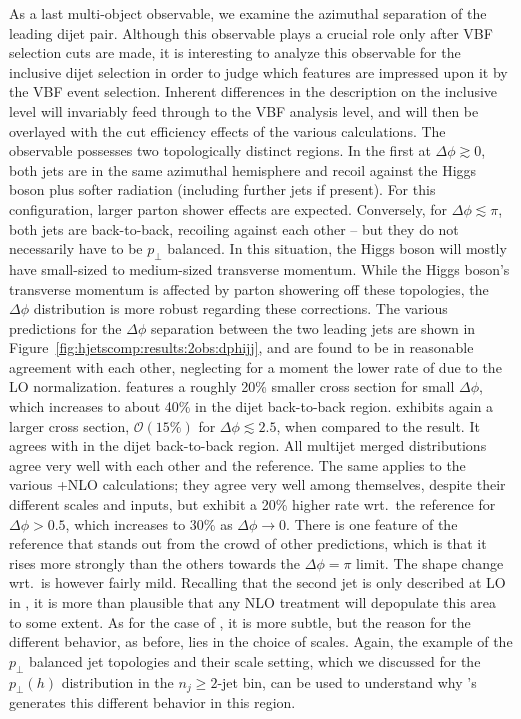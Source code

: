 As a last multi-object observable, we examine the azimuthal separation of 
the leading dijet pair. Although this observable plays a crucial role 
only after VBF selection cuts are made,  it is interesting to analyze this
observable for the inclusive dijet selection in order to judge which features
are impressed upon it by the VBF event selection.
Inherent differences in the description on the inclusive level will
invariably feed through to the VBF analysis level, and will then be
overlayed with the cut efficiency effects of the various calculations.
The observable possesses two topologically distinct regions. In the
first at $\Delta\phi\gtrsim0$, both jets are in the same azimuthal
hemisphere and recoil against the Higgs boson plus softer radiation
(including further jets if present). 
For this configuration, larger
parton shower effects are expected.
Conversely, for $\Delta\phi\lesssim\pi$, both jets are back-to-back,
recoiling against each other -- but they do not necessarily have to be
$p_\perp$ balanced. In this situation, the Higgs boson will
mostly have small-sized to medium-sized transverse momentum.
While the Higgs boson's transverse momentum is affected by parton
showering off these topologies, the $\Delta\phi$ distribution is more
robust regarding these corrections.
The various predictions for the $\Delta\phi$ separation between the
two leading jets are shown in Figure~\ref{fig:hjetscomp:results:2obs:dphijj},
and are found to be in reasonable agreement with each other,
neglecting for a moment the lower rate of \hjetscompHej due to the LO
normalization. \hjetscompHej
features a roughly 20\% smaller cross section for small $\Delta\phi$,
which increases to about 40\% in the dijet back-to-back region.
\hjetscompSherpa \hjetscompNNLOPS exhibits again a larger cross section,
$\mathcal{O}(15\%)$ for $\Delta\phi\lesssim2.5$, when compared to the
\hjetscompPowheg \hjetscompNNLOPS result. It agrees with \hjetscompPowheg \hjetscompNNLOPS  in the dijet back-to-back
region. All multijet merged distributions agree very well with each
other and the reference. The same applies to the various
\hjetscompGoSam{}+\hjetscompSherpa NLO calculations; they agree very well among
themselves, despite their different scales and inputs, but exhibit a
20\% higher rate wrt.~the reference for $\Delta\phi>0.5$, which
increases to 30\% as $\Delta\phi\to0$. 
There is one feature of the \hjetscompPowheg reference that stands out from the
crowd of other predictions, which is that it rises more strongly
than the others towards the $\Delta\phi=\pi$ limit. The shape change
wrt.~\hjetscompHej is however fairly mild. Recalling that the second jet is
only described at LO in \hjetscompPowheg, it is more than plausible that any
NLO treatment will depopulate this area to some extent. As for the
case of \hjetscompSherpa \hjetscompNNLOPS, it is more subtle, but the reason for the
different behavior, as before, lies in the choice of 
scales. Again, the example of the $p_\perp$ balanced jet topologies and
their scale setting, which we discussed for the $p_\perp(h)$
distribution in the $n_j\ge2$-jet bin, can be used to understand why
\hjetscompSherpa's \hjetscompNNLOPS generates this different behavior in this region.



